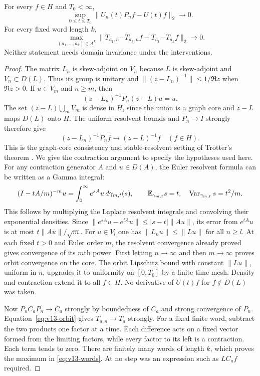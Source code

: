 \begin{lemma}
\label{lem:v13-words}
For every $f\in H$ and $T_0<\infty$,
\begin{equation}\label{eq:v13-orbit}
 \sup_{0\le t\le T_0}\|U_n(t)P_nf-U(t)f\|_2\longrightarrow0.
\end{equation}
For every fixed word length $k$,
\begin{equation}\label{eq:v13-words}
 \max_{(a_1,\ldots,a_k)\in A^k}
 \|T_{a_1,n}\cdots T_{a_k,n}f-T_{a_1}\cdots T_{a_k}f\|_2
                         \longrightarrow0.
\end{equation}
Neither statement needs domain invariance under the interventions.
\end{lemma}
\begin{proof}
The matrix $L_n$ is skew-adjoint on $V_n$ because $L$ is
skew-adjoint and $V_n\subset D(L)$. Thus its group is unitary and
$\|(z-L_n)^{-1}\|\le1/\Re z$ when $\Re z>0$.
If $u\in V_m$ and $n\ge m$, then
\[
 (z-L_n)^{-1}P_n(z-L)u=u.
\]
The set $(z-L)\bigcup_mV_m$ is dense in $H$, since the union is a
graph core and $z-L$ maps $D(L)$ onto $H$. The uniform resolvent
bounds and $P_n\to I$ strongly therefore give
\[
 (z-L_n)^{-1}P_nf\longrightarrow(z-L)^{-1}f\quad(f\in H).
\]
This is the graph-core consistency and stable-resolvent setting of
Trotter's theorem \cite[Theorem~5.2]{Trotter1958}. We give the
contraction argument to specify the hypotheses used here.
For any contraction generator $A$ and $u\in D(A)$, the Euler
resolvent formula can be written as a Gamma integral:
\[
 (I-tA/m)^{-m}u=\int_0^\infty e^{sA}u\,d\gamma_{m,t}(s),
 \qquad \mathbb E_{\gamma_{m,t}}s=t,\quad
               \operatorname{Var}_{\gamma_{m,t}}s=t^2/m.
\]
This follows by multiplying the Laplace resolvent integrals and
convolving their exponential densities. Since
$\|e^{sA}u-e^{tA}u\|\le|s-t|\|Au\|$, its error from $e^{tA}u$
is at most $t\|Au\|/\sqrt m$.
For $u\in V_l$ one has $\|L_nu\|\le\|Lu\|$ for all $n\ge l$.
At each fixed $t>0$ and Euler order $m$, the resolvent convergence
already proved gives convergence of its $m$th power. First letting
$n\to\infty$ and then $m\to\infty$ proves orbit convergence on the
core. The orbit Lipschitz bound with constant $\|Lu\|$, uniform in
$n$, upgrades it to uniformity on $[0,T_0]$ by a finite time mesh.
Density and contraction extend it to all $f\in H$. No derivative of
$U(t)f$ for $f\notin D(L)$ was taken.

Now $P_nC_aP_n\to C_a$ strongly by boundedness of $C_a$ and strong
convergence of $P_n$. Equation~\eqref{eq:v13-orbit} gives
$T_{a,n}\to T_a$ strongly. For a fixed finite word, subtract the two
products one factor at a time. Each difference acts on a fixed vector
formed from the limiting factors, while every factor to its left is
a contraction. Each term tends to zero. There are finitely many words
of length $k$, which proves the maximum in \eqref{eq:v13-words}.
At no step was an expression such as $LC_a f$ required.
\end{proof}

